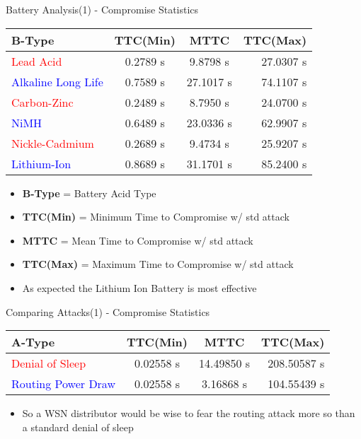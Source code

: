 \documentclass{beamer}
\begin{document}
	\begin{frame}{Battery Analysis(1) - Compromise Statistics}
	\centering
		\begin{tabular}{| l | c | c | r |}
			\hline
			\textbf{B-Type} & \textbf{TTC(Min)}& \textbf{MTTC} & \textbf{TTC(Max)} \\
			\hline
			\hline
			\textcolor{red}{Lead Acid} & 0.2789 s & 9.8798 s & 27.0307 s \\
			\hline
			\textcolor{blue}{Alkaline Long Life} & 0.7589 s & 27.1017 s & 74.1107 s \\
			\hline
			\textcolor{red}{Carbon-Zinc} &  0.2489 s & 8.7950 s & 24.0700 s \\
			\hline
			\textcolor{blue}{NiMH} & 0.6489 s & 23.0336 s & 62.9907 s \\
			\hline
			\textcolor{red}{Nickle-Cadmium} & 0.2689 s & 9.4734 s & 25.9207 s \\
			\hline
			\textcolor{blue}{Lithium-Ion} & 0.8689 s & 31.1701 s & 85.2400 s \\
			\hline
		\end{tabular}
		\begin{itemize}
			\item \textbf{B-Type} = Battery Acid Type
			\item \textbf{TTC(Min)} = Minimum Time to Compromise w/ std attack
			\item \textbf{MTTC} = Mean Time to Compromise w/ std attack
			\item \textbf{TTC(Max)} = Maximum Time to Compromise w/ std attack
			\item As expected the Lithium Ion Battery is most effective
		\end{itemize}
	\end{frame}
	
\begin{frame}{Comparing Attacks(1) - Compromise Statistics}
\centering
	\begin{tabular}{| l | c | c | r |}
	\hline
	\textbf{A-Type} & \textbf{TTC(Min)} & \textbf{MTTC} & \textbf{TTC(Max)} \\
	\hline
	\hline
	\textcolor{red}{Denial of Sleep} &  0.02558 s & 14.49850 s & 208.50587 s\\
	\hline
	\textcolor{blue}{Routing Power Draw} &  0.02558 s & 3.16868 s & 104.55439 s\\
	\hline
	\end{tabular}
	\begin{itemize}
	\item So a WSN distributor would be wise to fear the routing attack more so than a standard denial of sleep
	\end{itemize}
	

\end{frame}
\end{document}
